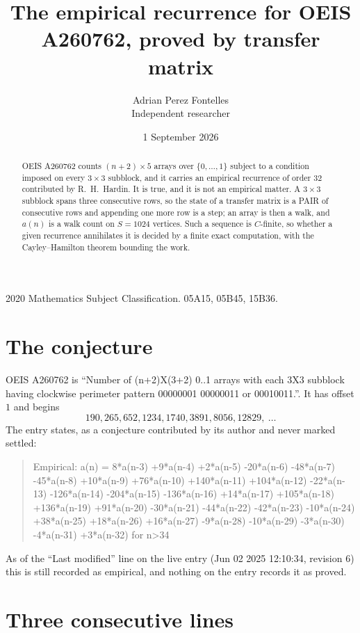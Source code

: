\documentclass[11pt,a4paper]{article}
\title{The empirical recurrence for OEIS A260762, proved by transfer matrix}
\author{Adrian Perez Fontelles\\ \small Independent researcher}
\date{1 September 2026}
\theoremstyle{plain}
\theoremstyle{definition}
\begin{document}
\maketitle

\begin{abstract}
OEIS A260762 counts $(n+2)\times5$ arrays over $\{0,\dots,1\}$ subject to a condition imposed on
every $3\times3$ subblock, and it carries an empirical recurrence of order $32$
contributed by R.~H.~Hardin. It is true, and it is not an empirical matter. A $3\times3$
subblock spans three consecutive rows, so the state of a transfer matrix is a PAIR of
consecutive rows and appending one more row is a step; an array is then a walk, and
$a(n)$ is a walk count on $S=1024$ vertices. Such a sequence is $C$-finite, so whether a given
recurrence annihilates it is decided by a finite exact computation, with the Cayley--Hamilton
theorem bounding the work.
\end{abstract}

\noindent\small 2020 Mathematics Subject Classification. 05A15, 05B45, 15B36.\normalsize

\section{The conjecture}

OEIS A260762 is ``Number of (n+2)X(3+2) 0..1 arrays with each 3X3 subblock having clockwise perimeter pattern 00000001 00000011 or 00010011.''. It has offset $1$ and begins
\[
190, 265, 652, 1234, 1740, 3891, 8056, 12829,\ \dots
\]
The entry states, as a conjecture contributed by its author and never marked settled:
\begin{quote}
Empirical: a(n) = 8*a(n-3) +9*a(n-4) +2*a(n-5) -20*a(n-6) -48*a(n-7) -45*a(n-8) +10*a(n-9) +76*a(n-10) +140*a(n-11) +104*a(n-12) -22*a(n-13) -126*a(n-14) -204*a(n-15) -136*a(n-16) +14*a(n-17) +105*a(n-18) +136*a(n-19) +91*a(n-20) -30*a(n-21) -44*a(n-22) -42*a(n-23) -10*a(n-24) +38*a(n-25) +18*a(n-26) +16*a(n-27) -9*a(n-28) -10*a(n-29) -3*a(n-30) -4*a(n-31) +3*a(n-32) for n>34
\end{quote}
As of the ``Last modified'' line on the live entry (Jun 02 2025 12:10:34, revision 6) this is still
recorded as empirical, and nothing on the entry records it as proved.

\section{Three consecutive lines}
\end{document}
